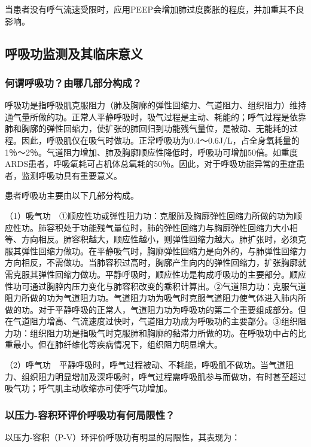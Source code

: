 当患者没有呼气流速受限时，应用PEEP会增加肺过度膨胀的程度，并加重其不良影响。

\subsection{呼吸功监测及其临床意义}

\subsubsection{何谓呼吸功？由哪几部分构成？}

呼吸功是指呼吸肌克服阻力（肺及胸廓的弹性回缩力、气道阻力、组织阻力）维持通气量所做的功。正常人平静呼吸时，吸气过程是主动、耗能的；呼气过程是依靠肺和胸廓的弹性回缩力，使扩张的肺回归到功能残气量位，是被动、无能耗的过程。因此，呼吸肌仅在吸气时做功。正常呼吸功为0.4～0.6J/L，占全身氧耗量的1％～2％。气道阻力增加、肺及胸廓顺应性降低时，呼吸功可增加50倍。如重度ARDS患者，呼吸氧耗可占机体总氧耗的50％。因此，对于呼吸功能异常的重症患者，监测呼吸功具有重要意义。

患者呼吸功主要由以下几部分构成。

（1）吸气功　①顺应性功或弹性阻力功：克服肺及胸廓弹性回缩力所做的功为顺应性功。肺容积处于功能残气量位时，肺的弹性回缩力与胸廓弹性回缩力大小相等、方向相反。肺容积越大，顺应性越小，则弹性回缩力越大。肺扩张时，必须克服其弹性回缩力做功。在平静吸气时，胸廓弹性回缩力是向外的，与肺弹性回缩力方向相反，不需做功。当肺容积过高时，胸廓产生向内的弹性回缩力，扩张胸廓就需克服其弹性回缩力做功。平静呼吸时，顺应性功是构成呼吸功的主要部分。顺应性功可通过胸腔内压力变化与肺容积改变的乘积计算出。②气道阻力功：克服气道阻力所做的功为气道阻力功。气道阻力功为吸气时克服气道阻力使气体进入肺内所做的功。对于平静呼吸的正常人，气道阻力功为呼吸功的第二个重要组成部分。但在气道阻力增高、气流速度过快时，气道阻力功成为呼吸功的主要部分。③组织阻力功：组织阻力功是指吸气时克服肺和胸廓的黏滞力所做的功。在呼吸功中占的比重最小。但在肺纤维化等疾病情况下，组织阻力明显增大。

（2）呼气功　平静呼吸时，呼气过程被动、不耗能，呼吸肌不做功。当气道阻力、组织阻力明显增加及深呼吸时，呼气过程需呼吸肌参与而做功，有时甚至超过吸气功；呼气肌主动收缩亦可使呼气功增加。

\subsubsection{以压力-容积环评价呼吸功有何局限性？}

以压力-容积（P-V）环评价呼吸功有明显的局限性，其表现为：


